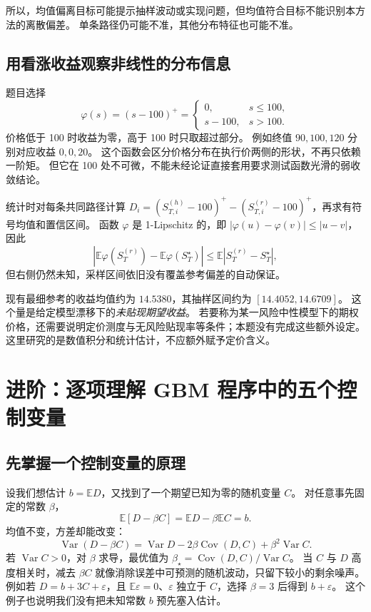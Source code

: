 \documentclass[11pt,a4paper,fontset=none]{ctexart}
\numberwithin{equation}{section}
\newcommand{\E}{\mathbb E}
\DeclareMathOperator{\Var}{Var}
\DeclareMathOperator{\Cov}{Cov}
\begin{document}
所以，均值偏离目标可能提示抽样波动或实现问题，但均值符合目标不能识别本方法的离散偏差。
单条路径仍可能不准，其他分布特征也可能不准。

\subsection{用看涨收益观察非线性的分布信息}
题目选择
\begin{equation}\label{eq:ref-payoff}
 \varphi(s)=(s-100)^+=\begin{cases}0,&s\le100,\\s-100,&s>100.\end{cases}
\end{equation}
价格低于 100 时收益为零，高于 100 时只取超过部分。
例如终值 $90,100,120$ 分别对应收益 $0,0,20$。
这个函数会区分价格分布在执行价两侧的形状，不再只依赖一阶矩。
但它在 100 处不可微，不能未经论证直接套用要求测试函数光滑的弱收敛结论。

统计时对每条共同路径计算 $D_i=(S_{T,i}^{(h)}-100)^+-(S_{T,i}^{(r)}-100)^+$，再求有符号均值和置信区间。
函数 $\varphi$ 是 1-Lipschitz 的，即 $|\varphi(u)-\varphi(v)|\le|u-v|$，因此
\begin{equation}\label{eq:ref-payoff-bound}
 |\E\varphi(S_T^{(r)})-\E\varphi(S_T^\star)|
 \le\E|S_T^{(r)}-S_T^\star|,
\end{equation}
但右侧仍然未知，采样区间依旧没有覆盖参考偏差的自动保证。

现有最细参考的收益均值约为 $14.5380$，其抽样区间约为 $[14.4052,14.6709]$。
这个量是给定模型漂移下的\emph{未贴现期望收益}。
若要称为某一风险中性模型下的期权价格，还需要说明定价测度与无风险贴现率等条件；本题没有完成这些额外设定。
这里研究的是数值积分和统计估计，不应额外赋予定价含义。


\section{进阶：逐项理解 GBM 程序中的五个控制变量}\label{sec:controls}
\subsection{先掌握一个控制变量的原理}
设我们想估计 $b=\E D$，又找到了一个期望已知为零的随机变量 $C$。
对任意事先固定的常数 $\beta$，
\begin{equation}\label{eq:cv-unbiased}
 \E[D-\beta C]=\E D-\beta\E C=b.
\end{equation}
均值不变，方差却能改变：
\begin{equation}\label{eq:cv-variance}
 \Var(D-\beta C)=\Var D-2\beta\Cov(D,C)+\beta^2\Var C.
\end{equation}
若 $\Var C>0$，对 $\beta$ 求导，最优值为 $\beta_\star=\Cov(D,C)/\Var C$。
当 $C$ 与 $D$ 高度相关时，减去 $\beta C$ 就像消除误差中可预测的随机波动，只留下较小的剩余噪声。
例如若 $D=b+3C+\varepsilon$，且 $\E\varepsilon=0$、$\varepsilon$ 独立于 $C$，选择 $\beta=3$ 后得到 $b+\varepsilon$。
这个例子也说明我们没有把未知常数 $b$ 预先塞入估计。
\end{document}
